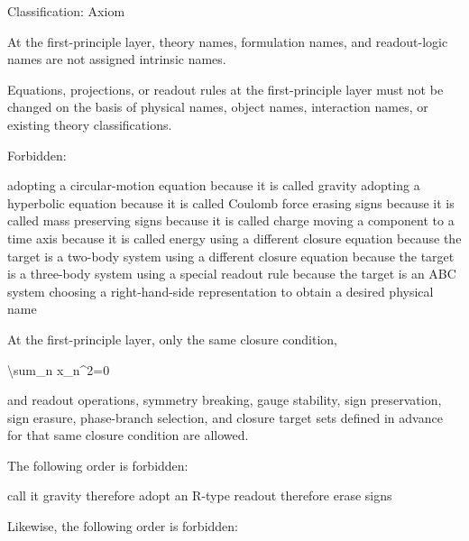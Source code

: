 \documentclass[
  a4paper,
]{article}
\newenvironment{Shaded}{}{}
\newcommand{\NormalTok}[1]{#1}
\begin{document}
Classification: Axiom

At the first-principle layer, theory names, formulation names, and
readout-logic names are not assigned intrinsic names.

Equations, projections, or readout rules at the first-principle layer
must not be changed on the basis of physical names, object names,
interaction names, or existing theory classifications.

Forbidden:

\begin{Shaded}
\begin{Highlighting}[]
\NormalTok{adopting a circular{-}motion equation because it is called gravity}
\NormalTok{adopting a hyperbolic equation because it is called Coulomb force}
\NormalTok{erasing signs because it is called mass}
\NormalTok{preserving signs because it is called charge}
\NormalTok{moving a component to a time axis because it is called energy}
\NormalTok{using a different closure equation because the target is a two{-}body system}
\NormalTok{using a different closure equation because the target is a three{-}body system}
\NormalTok{using a special readout rule because the target is an ABC system}
\NormalTok{choosing a right{-}hand{-}side representation to obtain a desired physical name}
\end{Highlighting}
\end{Shaded}

At the first-principle layer, only the same closure condition,

\begin{Shaded}
\begin{Highlighting}[]
\NormalTok{\textbackslash{}sum\_n x\_n\^{}2=0}
\end{Highlighting}
\end{Shaded}

and readout operations, symmetry breaking, gauge stability, sign
preservation, sign erasure, phase-branch selection, and closure target
sets defined in advance for that same closure condition are allowed.

The following order is forbidden:

\begin{Shaded}
\begin{Highlighting}[]
\NormalTok{call it gravity}
\NormalTok{therefore adopt an R{-}type readout}
\NormalTok{therefore erase signs}
\end{Highlighting}
\end{Shaded}

Likewise, the following order is forbidden:
\end{document}
